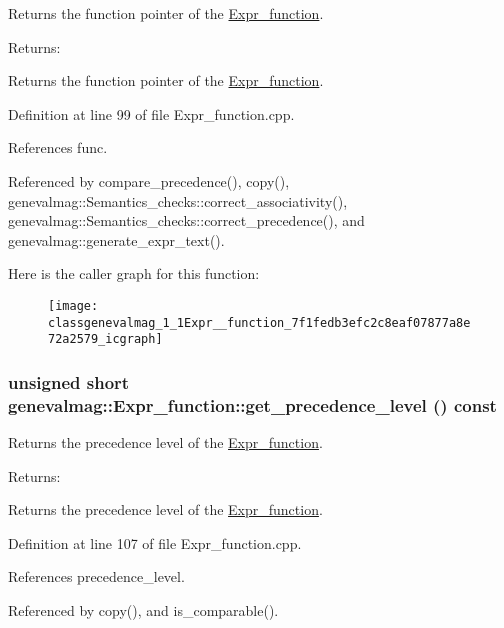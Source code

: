 Returns the function pointer of the \hyperlink{classgenevalmag_1_1Expr__function}{Expr\_\-function}. \begin{Desc}
\item[Returns:]\end{Desc}
Returns the function pointer of the \hyperlink{classgenevalmag_1_1Expr__function}{Expr\_\-function}. 

Definition at line 99 of file Expr\_\-function.cpp.

References func.

Referenced by compare\_\-precedence(), copy(), genevalmag::Semantics\_\-checks::correct\_\-associativity(), genevalmag::Semantics\_\-checks::correct\_\-precedence(), and genevalmag::generate\_\-expr\_\-text().

Here is the caller graph for this function:\nopagebreak
\begin{figure}[H]
\begin{center}
\leavevmode
\texttt{[image: classgenevalmag\_1\_1Expr\_\_function\_7f1fedb3efc2c8eaf07877a8e72a2579\_icgraph]}
\end{center}
\end{figure}
\hypertarget{classgenevalmag_1_1Expr__function_25e611b881f5e74cd37d968c128a4f1b}{
\subsubsection[{get\_\-precedence\_\-level}]{\setlength{\rightskip}{0pt plus 5cm}unsigned short genevalmag::Expr\_\-function::get\_\-precedence\_\-level () const}}
\label{classgenevalmag_1_1Expr__function_25e611b881f5e74cd37d968c128a4f1b}


Returns the precedence level of the \hyperlink{classgenevalmag_1_1Expr__function}{Expr\_\-function}. \begin{Desc}
\item[Returns:]\end{Desc}
Returns the precedence level of the \hyperlink{classgenevalmag_1_1Expr__function}{Expr\_\-function}. 

Definition at line 107 of file Expr\_\-function.cpp.

References precedence\_\-level.

Referenced by copy(), and is\_\-comparable().

